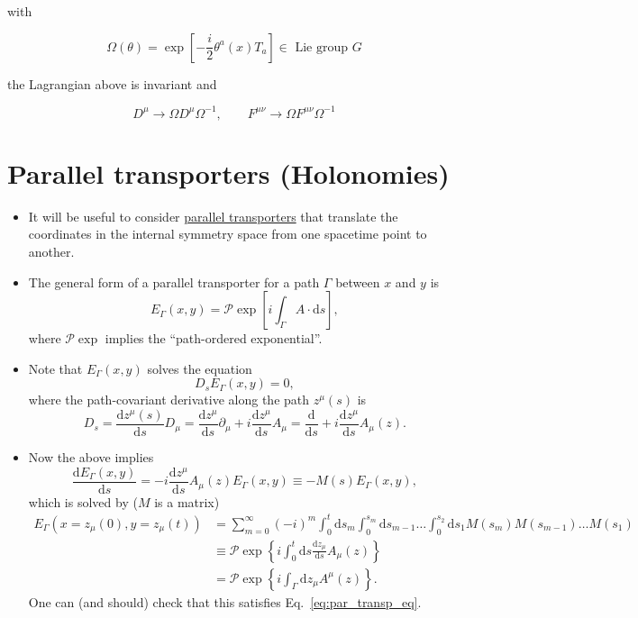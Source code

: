 with

\begin{equation}
\Omega(\theta)=\exp \left[-\frac{i}{2} \theta^{a}\left(x\right) T_{a}\right] \in \text { Lie group } G
\end{equation}

the Lagrangian above is invariant and

\begin{equation}
D^{\mu} \rightarrow \Omega D^{\mu} \Omega^{-1}, \qquad F^{\mu \nu} \rightarrow \Omega F^{\mu \nu} \Omega^{-1}
\end{equation}

\section{Parallel transporters (Holonomies)}
\begin{itemize}
\item It will be useful to consider \underline{parallel transporters} that translate the coordinates in the internal symmetry space from one spacetime point to another.

\item The general form of a parallel transporter for a path $\Gamma$ between $x$ and $y$ is
\begin{equation}
    E_\Gamma(x,y) = \mathcal{P}\exp\left[i \int_\Gamma A \cdot \text{d}s\right],
\end{equation}
where $\mathcal{P} \exp$ implies the ``path-ordered exponential''.

\item Note that $E_\Gamma(x,y)$ solves the equation
\begin{equation}
\label{eq:par_transp_eq}
    D_sE_\Gamma(x,y) = 0,
\end{equation}
where the path-covariant derivative along the path $z^\mu(s)$ is
\begin{equation}
    D_s = \frac{\text{d}z^\mu(s)}{\text{d}s} D_\mu = \frac{\text{d}z^\mu}{\text{d}s}\partial_\mu + i \frac{\text{d}z^\mu}{\text{d}s}A_\mu = \frac{\text{d}}{\text{d}s} + i \frac{\text{d}z^\mu}{\text{d}s}A_\mu(z). 
\end{equation}
\item Now the above implies
\begin{equation}
\frac{\text{d} E_{\Gamma}(x, y)}{\text{d} s}=-i \frac{\text{d} z^\mu}{\text{d} s} A_{\mu}(z) E_{\Gamma}(x, y) \equiv-M(s) E_{\Gamma}(x, y),
\end{equation}
which is solved by ($M$ is a matrix)
\begin{align}
    E_\Gamma(x = z_\mu(0), y = z_\mu(t)) &= \sum_{m=0}^\infty (-i)^m \int_0^t \text{d}s_m \int_0^{s_m}\text{d}s_{m-1}\ldots\int_0^{s_2}\text{d}s_1 M(s_m)M(s_{m-1})\ldots M(s_1) \nonumber\\
    &\equiv \mathcal{P}\exp \left\{i \int_0^t \text{d}s \frac{\text{d}z_\mu}{\text{d}s} A_\mu(z) \right\} \nonumber \\
    &= \mathcal{P}\exp\left\{ i \int_\Gamma \text{d}z_\mu A^\mu(z) \right\}.
\end{align}
One can (and should)  check that this satisfies Eq.~\eqref{eq:par_transp_eq}.
\end{itemize}
